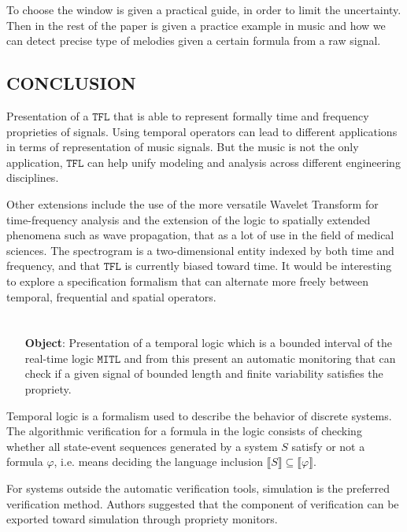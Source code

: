 \documentclass{suftesi}
\renewcommand{\b}{\textbf}
\newcommand{\TFL}{$\mathtt{TFL}$ }
\newcommand{\MITL}{$\mathtt{MITL}$ }
\newcommand{\sem}[1]{\llbracket #1 \rrbracket}
\begin{document}
To choose the window is given a practical guide, in order to limit the uncertainty. Then in the rest of the paper is given a practice example in music and how we can detect precise type of melodies given a certain formula from a raw signal.

\section{CONCLUSION}

Presentation of a \TFL that is able to represent formally time and frequency proprieties of signals. Using temporal operators can lead to different applications in terms of representation of music signals. But the music is not the only application, \TFL can help unify modeling and analysis across different engineering disciplines. 

Other extensions include the use of the more versatile Wavelet Transform for time-frequency analysis and the extension of the logic to spatially extended phenomena such as wave propagation, that as a lot of use in the field of medical sciences. 
The spectrogram is a two-dimensional entity indexed by both time and frequency, and that \TFL is currently biased toward time. It would be interesting to explore a specification formalism that can alternate more freely between temporal, frequential and spatial operators.

\chapter{}

\begin{itemize} [leftmargin=1.25cm]
    \item [\b{Object}:] Presentation of a temporal logic which is a bounded interval of the real-time logic \MITL and from this present an automatic monitoring that can check if a given signal of bounded length and finite variability satisfies the propriety.
\end{itemize}

Temporal logic is a formalism used to describe the behavior of discrete systems. The algorithmic verification for a formula in the logic consists of checking whether all state-event sequences generated by a system $S$ satisfy or not a formula $\varphi$, i.e. means deciding the language inclusion $\sem{S}\subseteq\sem{\varphi}$. 

For systems outside the automatic verification tools, simulation is the preferred verification method. Authors suggested that the component of verification can be exported toward simulation through propriety monitors.
\end{document}
